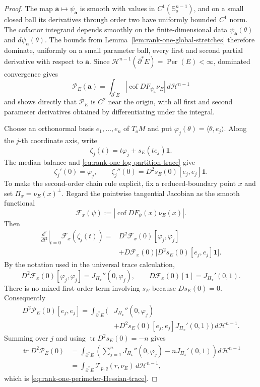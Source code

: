 \documentclass[11pt,reqno]{amsart}
\numberwithin{equation}{section}
\theoremstyle{definition}
\theoremstyle{remark}
\newcommand{\Per}{\operatorname{Per}}
\newcommand{\cof}{\operatorname{cof}}
\begin{document}
\begin{proof}
The map $\mathbf a\mapsto\psi_{\mathbf a}$ is smooth with values in
$C^1(\mathbb S_o^{n-1})$, and on a small closed ball its derivatives through
order two have uniformly bounded $C^1$ norm.  The cofactor integrand depends
smoothly on the finite-dimensional data $\psi_{\mathbf a}(\theta)$ and
$d\psi_{\mathbf a}(\theta)$.  The bounds from
Lemma~\ref{lem:rank-one-global-stretches} therefore dominate, uniformly on a
small parameter ball, every first and second partial derivative with respect
to $\mathbf a$.  Since $\mathcal H^{n-1}(\partial^*E)=\Per(E)<\infty$,
dominated convergence gives
\[
 \mathscr P_E(\mathbf a)
 =\int_{\partial^*E}|\cof DF_{\psi_{\mathbf a}}\nu_E|\,d\mathcal H^{n-1}
\]
and shows directly that $\mathscr P_E$ is $C^2$ near the origin, with all
first and second parameter derivatives obtained by differentiating under the
integral.

Choose an orthonormal basis $e_1,\ldots,e_n$ of $T_oM$ and put
$\varphi_j(\theta)=\langle\theta,e_j\rangle$.  Along the $j$-th coordinate
axis, write
\[
 \zeta_j(t)=t\varphi_j+s_E(te_j)\mathbf1.
\]
The median balance and \eqref{eq:rank-one-log-partition-trace} give
\[
 \zeta_j'(0)=\varphi_j,
 \qquad
 \zeta_j''(0)=D^2s_E(0)[e_j,e_j]\mathbf1.
\]
To make the second-order chain rule explicit, fix a reduced-boundary point
$x$ and set $\Pi_x=\nu_E(x)^\perp$.  Regard the pointwise tangential Jacobian
as the smooth functional
\[
 \mathcal F_x(\psi)
 :=|\cof DF_\psi(x)\nu_E(x)|.
\]
Then
\[
\begin{aligned}
\left.\frac{d^2}{dt^2}\right|_{t=0}\mathcal F_x(\zeta_j(t))
={}&D^2\mathcal F_x(0)[\varphi_j,\varphi_j]\\
&+D\mathcal F_x(0)
 \bigl[D^2s_E(0)[e_j,e_j]\mathbf1\bigr].
\end{aligned}
\]
By the notation used in the universal trace calculation,
\[
D^2\mathcal F_x(0)[\varphi_j,\varphi_j]
=J_{\Pi_x}''(0,\varphi_j),
\qquad
D\mathcal F_x(0)[\mathbf1]=J_{\Pi_x}'(0,1).
\]
There is no mixed first-order term involving $s_E$ because $Ds_E(0)=0$.
Consequently
\[
\begin{aligned}
 D^2\mathscr P_E(0)[e_j,e_j]
 =\int_{\partial^*E}\bigl(&J_{\Pi_x}''(0,\varphi_j)\\
 &+D^2s_E(0)[e_j,e_j]J_{\Pi_x}'(0,1)\bigr)
 \,d\mathcal H^{n-1}.
\end{aligned}
\]
Summing over $j$ and using
$\operatorname{tr}D^2s_E(0)=-n$ gives
\[
\begin{aligned}
\operatorname{tr}D^2\mathscr P_E(0)
&=\int_{\partial^*E}
\left(
\sum_{j=1}^nJ_{\Pi_x}''(0,\varphi_j)
-nJ_{\Pi_x}'(0,1)
\right)d\mathcal H^{n-1}\\
&=\int_{\partial^*E}\mathscr T_{p,q}(r,\nu_E)\,d\mathcal H^{n-1},
\end{aligned}
\]
which is \eqref{eq:rank-one-perimeter-Hessian-trace}.
\end{proof}
\end{document}
